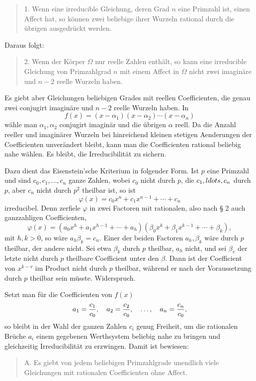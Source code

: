 \documentclass[11pt]{article}
\begin{document}
\begin{quote}
1. Wenn eine irreducible Gleichung, deren Grad $n$ eine Primzahl ist, einen Affect hat, so können zwei beliebige ihrer Wurzeln rational durch die übrigen ausgedrückt werden.
\end{quote}

Daraus folgt:
\begin{quote}
2. Wenn der Körper $\Omega$ nur reelle Zahlen enthält, so kann eine irreducible Gleichung von Primzahlgrad $n$ mit einem Affect in $\Omega$ nicht zwei imaginäre und $n-2$ reelle Wurzeln haben.
\end{quote}

Es giebt aber Gleichungen beliebigen Grades mit reellen Coefficienten, die genau zwei conjugirt imaginäre und $n-2$ reelle Wurzeln haben. In
\[
  f(x)=(x-\alpha_1)(x-\alpha_2)\cdots(x-\alpha_n)
\]
wähle man $\alpha_1,\alpha_2$ conjugirt imaginär und die übrigen $\alpha$ reell. Da die Anzahl reeller und imaginärer Wurzeln bei hinreichend kleinen stetigen Aenderungen der Coefficienten unverändert bleibt, kann man die Coefficienten rational beliebig nahe wählen. Es bleibt, die Irreducibilität zu sichern.

Dazu dient das Eisenstein'sche Kriterium in folgender Form. Ist $p$ eine Primzahl und sind $c_0,c_1,\ldots,c_n$ ganze Zahlen, wobei $c_0$ nicht durch $p$, die $c_1,\\ldots,c_n$ durch $p$, aber $c_n$ nicht durch $p^2$ theilbar ist, so ist
\[
  \varphi(x)=c_0x^n+c_1x^{n-1}+\cdots+c_n
\]
irreducibel. Denn zerfiele $\varphi$ in zwei Factoren mit rationalen, also nach § 2 auch ganzzahligen Coefficienten,
\[
\varphi(x)=(a_0x^h+a_1x^{h-1}+\cdots+a_h)
          (\beta_0x^k+\beta_1x^{k-1}+\cdots+\beta_k),
\]
mit $h,k>0$, so wäre $a_h\beta_k=c_n$. Einer der beiden Factoren $a_h,\beta_k$ wäre durch $p$ theilbar, der andere nicht. Sei etwa $\beta_k$ durch $p$ theilbar, $a_h$ nicht, und sei $\beta_v$ der letzte nicht durch $p$ theilbare Coefficient unter den $\beta$. Dann ist der Coefficient von $x^{k-v}$ im Product nicht durch $p$ theilbar, während er nach der Voraussetzung durch $p$ theilbar sein müsste. Widerspruch.

Setzt man für die Coefficienten von $f(x)$
\[
  a_1={c_1\over c_0},\quad a_2={c_2\over c_0},\quad \ldots,\quad a_n={c_n\over c_0},
\]
so bleibt in der Wahl der ganzen Zahlen $c_i$ genug Freiheit, um die rationalen Brüche $a_i$ einem gegebenen Werthsystem beliebig nahe zu bringen und gleichzeitig Irreducibilität zu erzwingen. Damit ist bewiesen:
\begin{quote}
A. Es giebt von jedem beliebigen Primzahlgrade unendlich viele Gleichungen mit rationalen Coefficienten ohne Affect.
\end{quote}
\end{document}
